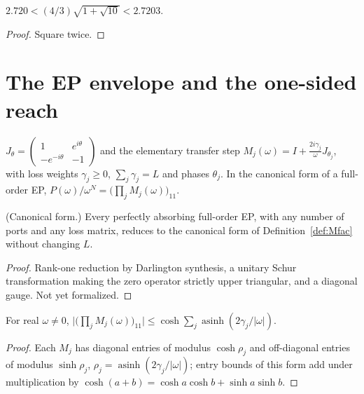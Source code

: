 \begin{lemma}\label{lem:dimer_value_bounds}
\leanok
$2.720<(4/3)\sqrt{1+\sqrt{10}}<2.7203$.
\end{lemma}
\begin{proof}\leanok
Square twice.
\end{proof}

\chapter{The EP envelope and the one-sided reach}

\begin{definition}\label{def:Mfac}
\leanok
$J_\theta=\begin{pmatrix}1&e^{i\theta}\\-e^{-i\theta}&-1\end{pmatrix}$ and the elementary transfer step
$M_j(\omega)=I+\frac{2i\gamma_j}{\omega}J_{\theta_j}$, with loss weights $\gamma_j\ge0$,
$\sum_j\gamma_j=L$ and phases $\theta_j$. In the canonical form of a full-order EP,
$P(\omega)/\omega^N=\big(\prod_j M_j(\omega)\big)_{11}$.
\end{definition}

\begin{theorem}\label{thm:canonical_form}
(Canonical form.) Every perfectly absorbing full-order EP, with any number of ports and any loss
matrix, reduces to the canonical form of Definition~\ref{def:Mfac} without changing $L$.
\end{theorem}
\begin{proof}
Rank-one reduction by Darlington synthesis, a unitary Schur transformation making the zero operator
strictly upper triangular, and a diagonal gauge. Not yet formalized.
\end{proof}

\begin{lemma}\label{lem:envelope_prod}
\leanok
{}
For real $\omega\ne0$,
$\big|\big(\prod_j M_j(\omega)\big)_{11}\big|\le\cosh\sum_j\operatorname{asinh}(2\gamma_j/|\omega|)$.
\end{lemma}
\begin{proof}\leanok
Each $M_j$ has diagonal entries of modulus $\cosh\rho_j$ and off-diagonal entries of modulus
$\sinh\rho_j$, $\rho_j=\operatorname{asinh}(2\gamma_j/|\omega|)$; entry bounds of this form add under
multiplication by $\cosh(a+b)=\cosh a\cosh b+\sinh a\sinh b$.
\end{proof}

